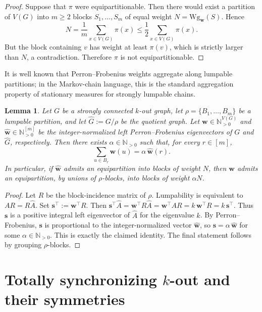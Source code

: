 \documentclass[a4paper,10pt]{amsart}
\theoremstyle{plain}
\newtheorem{lemma}[theorem]{Lemma}
\theoremstyle{definition}
\begin{document}
\begin{proof}
Suppose that $\pi$ were equipartitionable. Then there would exist a partition of $V(G)$ into $m\ge 2$ blocks $S_1, \ldots, S_m$ of equal weight $N=\mathrm{Wg}_{\mathbf w}(S)$. Hence
\[
N=\frac1m\sum_{x\in V(G)}\pi(x)\le \frac12\sum_{x\in V(G)}\pi(x).
\]
But the block containing $v$ has weight at least $\pi(v)$, which is strictly larger than $N$, a contradiction. Therefore $\pi$ is not equipartitionable.
\end{proof}

It is well known that Perron--Frobenius weights aggregate along lumpable partitions; in the Markov-chain language, this is the standard aggregation property of stationary measures for strongly lumpable chains.

\begin{lemma}\label{lem:pf-lump-part}
Let $G$ be a strongly connected $k$-out graph, let $\rho=\{B_1,\dots,B_m\}$ be a lumpable partition, and let $\widehat G:=G/\rho$ be the quotient graph. Let $\mathbf w\in\mathbb N^{V(G)}_{>0}$ and $\widehat{\mathbf w}\in\mathbb N^{[m]}_{>0}$ be the integer-normalized left Perron--Frobenius eigenvectors of $G$ and $\widehat G$, respectively. Then there exists $\alpha\in\mathbb N_{>0}$ such that, for every $r\in[m]$,
\[
\sum_{u\in B_r}\mathbf w(u)=\alpha\,\widehat{\mathbf w}(r).
\]
In particular, if $\widehat{\mathbf w}$ admits an equipartition into blocks of weight $N$, then $\mathbf w$ admits an equipartition, by unions of $\rho$-blocks, into blocks of weight $\alpha N$.
\end{lemma}
\begin{proof}
Let $R$ be the block-incidence matrix of $\rho$. Lumpability is equivalent to $AR=R\widehat A$. Set $\mathbf s^\top:=\mathbf w^\top R$. Then
$\mathbf s^\top\widehat A=\mathbf w^\top R\widehat A=\mathbf w^\top AR=k\,\mathbf w^\top R=k\,\mathbf s^\top$.
Thus $\mathbf s$ is a positive integral left eigenvector of $\widehat A$ for the eigenvalue $k$. By Perron--Frobenius, $\mathbf s$ is proportional to the integer-normalized vector $\widehat{\mathbf w}$, so $\mathbf s=\alpha\,\widehat{\mathbf w}$ for some $\alpha\in\mathbb N_{>0}$. This is exactly the claimed identity. The final statement follows by grouping $\rho$-blocks.
\end{proof}




\section{Totally synchronizing $k$-out  and their symmetries}
\end{document}
